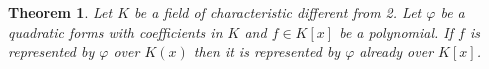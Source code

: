 \documentclass[12pt,reqno]{amsart}   	%
\newtheorem{thm}{Theorem}[section]
\newtheorem{lemma}[thm]{Lemma}
\theoremstyle{obs}
\theoremstyle{prob}
\theoremstyle{conj}
\theoremstyle{remark}
\begin{document}
\begin{thm}
Let $K$ be a field of characteristic different from 2. Let $\varphi$ be a quadratic forms with coefficients in $K$ and $f \in K[x]$ be a polynomial. If $f$ is represented by $\varphi$ over $K(x)$ then it is represented by $\varphi$ already over $K[x]$.
\end{thm}




 


\end{document}
